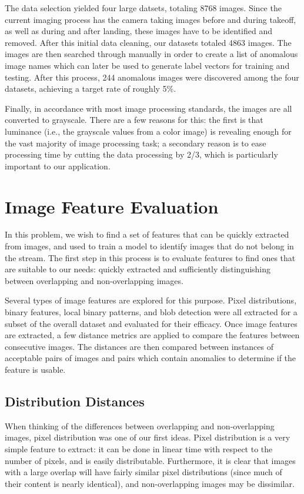 The data selection yielded four large datsets, totaling 8768 images.
Since the current imaging process has the camera taking images before and during takeoff, as well as during and after landing, these images have to be identified and removed.
After this initial data cleaning, our datasets totaled 4863 images.
The images are then searched through manually in order to create a list of anomalous image names which can later be used to generate label vectors for training and testing.
After this process, 244 anomalous images were discovered among the four datasets, achieving a target rate of roughly 5\%.

Finally, in accordance with most image processing standards, the images are all converted to grayscale.
There are a few reasons for this: the first is that luminance (i.e., the grayscale values from a color image) is revealing enough for the vast majority of image processing task; a secondary reason is to ease processing time by cutting the data processing by 2/3, which is particularly important to our application.


\section{Image Feature Evaluation}

In this problem, we wish to find a set of features that can be quickly extracted from images, and used to train a model to identify images that do not belong in the stream.
The first step in this process is to evaluate features to find ones that are suitable to our needs: quickly extracted and sufficiently distinguishing between overlapping and non-overlapping images.

Several types of image features are explored for this purpose.
Pixel distributions, binary features, local binary patterns, and blob detection were all extracted for a subset of the overall dataset and evaluated for their efficacy.
Once image features are extracted, a few distance metrics are applied to compare the features between consecutive images.
The distances are then compared between instances of acceptable pairs of images and pairs which contain anomalies to determine if the feature is usable.


\subsection{Distribution Distances}

When thinking of the differences between overlapping and non-overlapping images, pixel distribution was one of our first ideas.
Pixel distribution is a very simple feature to extract: it can be done in linear time with respect to the number of pixels, and is easily distributable.
Furthermore, it is clear that images with a large overlap will have fairly similar pixel distributions (since much of their content is nearly identical), and non-overlapping images may be dissimilar.

